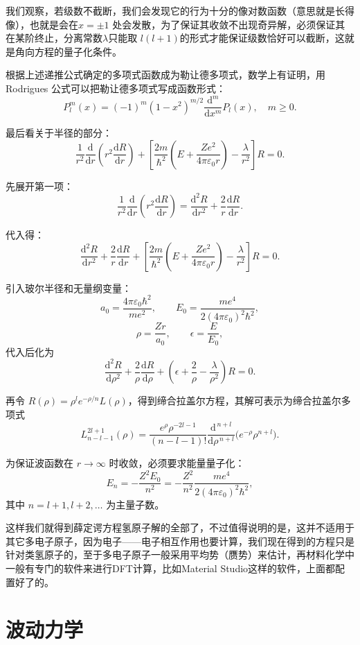 \documentclass[UTF8]{ctexbook}
\begin{document}
我们观察，若级数不截断，我们会发现它的行为十分的像对数函数（意思就是长得像），也就是会在\(x=\pm1\) 处会发散，为了保证其收敛不出现奇异解，必须保证其在某阶终止，分离常数$\lambda$只能取 \(l(l+1)\)的形式才能保证级数恰好可以截断，这就是角向方程的量子化条件。

根据上述递推公式确定的多项式函数成为勒让德多项式，数学上有证明，用 Rodrigues 公式可以把勒让德多项式写成函数形式：
\[
P_l^m(x)=(-1)^m(1-x^2)^{m/2}\frac{\mathrm d^m}{\mathrm dx^m}P_l(x),\quad m\ge0.
\]

最后看关于半径的部分：
\[
\frac{1}{r^2}\frac{\mathrm d}{\mathrm dr}\left(r^2\frac{\mathrm dR}{\mathrm dr}\right)
+\left[\frac{2m}{\hbar^2}\left(E+\frac{Ze^2}{4\pi\varepsilon_0 r}\right)-\frac{\lambda}{r^2}\right]R=0.
\]

先展开第一项：
\[
\frac{1}{r^2}\frac{\mathrm d}{\mathrm dr}\left(r^2\frac{\mathrm dR}{\mathrm dr}\right)
=\frac{\mathrm d^2R}{\mathrm dr^2}+\frac{2}{r}\frac{\mathrm dR}{\mathrm dr}.
\]

代入得：
\[
\frac{\mathrm d^2R}{\mathrm dr^2}+\frac{2}{r}\frac{\mathrm dR}{\mathrm dr}
+\left[\frac{2m}{\hbar^2}\left(E+\frac{Ze^2}{4\pi\varepsilon_0 r}\right)-\frac{\lambda}{r^2}\right]R=0.
\]

引入玻尔半径和无量纲变量：
\[
 a_0=\frac{4\pi\varepsilon_0\hbar^2}{me^2},\qquad
 E_0=\frac{me^4}{2(4\pi\varepsilon_0)^2\hbar^2},
\]
\[
\rho=\frac{Zr}{a_0},\qquad \epsilon=\frac{E}{E_0},
\]
代入后化为
\[
\frac{\mathrm d^2R}{\mathrm d\rho^2}+\frac{2}{\rho}\frac{\mathrm dR}{\mathrm d\rho}
+\left(\epsilon+\frac{2}{\rho}-\frac{\lambda}{\rho^2}\right)R=0.
\]

再令 \(R(\rho)=\rho^l e^{-\rho/n}L(\rho)\)，得到缔合拉盖尔方程，其解可表示为缔合拉盖尔多项式
\[
L_{n-l-1}^{2l+1}(\rho)
=\frac{e^{\rho}\rho^{-2l-1}}{(n-l-1)!}
\frac{\mathrm d^{\,n+l}}{\mathrm d\rho^{\,n+l}}\bigl(e^{-\rho}\rho^{n+l}\bigr).
\]

为保证波函数在 \(r\to\infty\) 时收敛，必须要求能量量子化：
\[
E_n=-\frac{Z^2E_0}{n^2}
=-\frac{Z^2}{n^2}\frac{me^4}{2(4\pi\varepsilon_0)^2\hbar^2},
\]
其中 \(n=l+1,l+2,\ldots\) 为主量子数。

这样我们就得到薛定谔方程氢原子解的全部了，不过值得说明的是，这并不适用于其它多电子原子，因为电子——电子相互作用也要计算，我们现在得到的方程只是针对类氢原子的，至于多电子原子一般采用平均势（赝势）来估计，再材料化学中一般有专门的软件来进行DFT计算，比如Material Studio这样的软件，上面都配置好了的。

\newpage
\section{波动力学}
\end{document}
